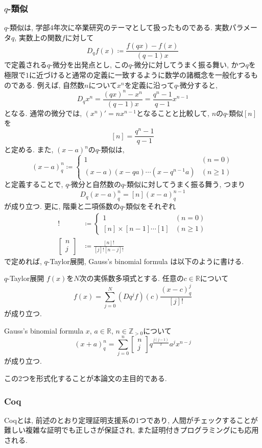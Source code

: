 \documentclass[11pt]{jsreport}
\theoremstyle{mystyle}
\newcommand{\Z}{\mathbb{Z}}
\newcommand{\R}{\mathbb{R}}
\newcommand{\qcoe}[2]{\left[\begin{array}{ccc}#1\\#2\end{array}\right]}
\newcommand{\0}{\textbf{0}}
\begin{document}
\subsubsection*{$q$-類似}
$q$-類似は, 学部4年次に卒業研究のテーマとして扱ったものである. 実数パラメータ$q$, 実数上の関数$f$に対して
\[
  D_q f(x) \coloneqq \frac{f(qx) - f(x)}{(q - 1) x}
\]
で定義される$q$-微分を出発点とし, この$q$-微分に対してうまく振る舞い, かつ$q$を極限で$1$に近づけると通常の定義に一致するように数学の諸概念を一般化するものである.
例えば, 自然数$n$について$x^n$を定義に沿って$q$-微分すると, 
\[
  D_q x^n = \frac{(qx)^n - x^n}{(q - 1) x} = \frac{q^n - 1}{q - 1} x^{n - 1}
\]
となる. 通常の微分では, $(x^n)' = n x^{n - 1}$となることと比較して, $n$の$q$-類似$[n]$を
\[
  [n] = \frac{q^n - 1}{q - 1}
\]
と定める. また, $(x - a)^n$の$q$-類似は, 
\[
  (x - a)^n_q \coloneqq \begin{cases}
                                  1 & (n = 0) \\
                                  (x - a) (x - qa) \cdots (x - q^{n - 1} a) & (n \ge 1)
                                \end{cases}
\]
と定義することで, $q$-微分と自然数の$q$-類似に対してうまく振る舞う, つまり
\[
  D_q (x - a)^n_q = [n](x - a)^{n - 1}_q
\]
が成り立つ. 更に, 階乗と二項係数の$q$-類似をそれぞれ
\begin{align*}
  [n]! &\coloneqq \begin{cases}
                        1 & (n = 0)\\
                        [n] \times [n   - 1] \cdots [1] & (n \ge 1)
                      \end{cases}\\
  \qcoe{n}{j} &\coloneqq \frac{[n]!}{[j]![n - j]!}
\end{align*}
で定めれば, $q$-Taylor展開, Gauss's binomial formula は以下のように書ける. 
\begin{itembox}{$q$-Taylor展開}
  $f(x)$を$N$次の実係数多項式とする. 任意の$c \in \R$について
  \[
    f(x) = \sum_{j = 0}^N (Dq^j f) (c) \frac{(x - c)^j_q}{[j]!}
  \]
  が成り立つ. 
\end{itembox}
\begin{itembox}{Gauss's binomial formula}
  $x$, $a \in \R$, $n \in \Z_{>0}$について
  \[
    (x+a)^n_q = \sum_{j=0}^n \qcoe{n}{j} q^{\frac{j(j-1)}{2}} a^j x^{n-j}
  \]
  が成り立つ. 
\end{itembox}
この2つを形式化することが本論文の主目的である. 
\subsubsection*{Coq}
Coqとは, 前述のとおり定理証明支援系の1つであり, 人間がチェックすることが難しい複雑な証明でも正しさが保証され, また証明付きプログラミングにも応用される. 
\end{document}
